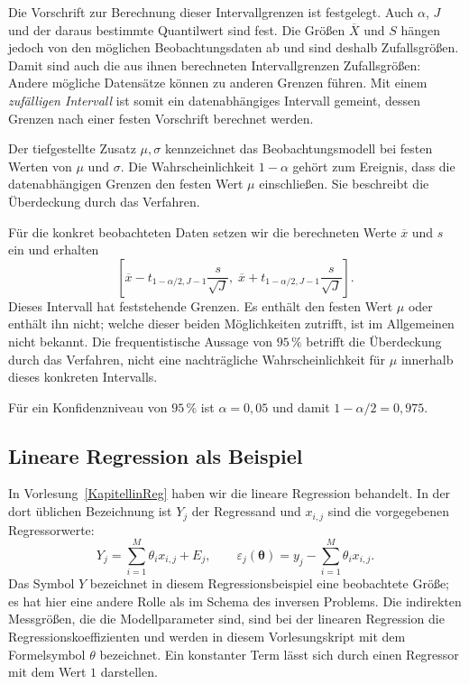 Die Vorschrift zur Berechnung dieser Intervallgrenzen ist festgelegt.
Auch $\alpha$, $J$ und der daraus bestimmte Quantilwert sind fest.
Die Größen $\overline X$ und $S$ hängen jedoch von den möglichen
Beobachtungsdaten ab und sind deshalb Zufallsgrößen. Damit sind
auch die aus ihnen berechneten Intervallgrenzen Zufallsgrößen:
Andere mögliche Datensätze können zu anderen Grenzen führen.
Mit einem \textsl{zufälligen Intervall} ist somit ein datenabhängiges
Intervall gemeint, dessen Grenzen nach einer festen Vorschrift
berechnet werden.

Der tiefgestellte Zusatz $\mu,\sigma$ kennzeichnet das
Beobachtungsmodell bei festen Werten von $\mu$ und $\sigma$.
Die Wahrscheinlichkeit $1-\alpha$ gehört zum Ereignis, dass
die datenabhängigen Grenzen den festen Wert $\mu$ einschließen.
Sie beschreibt die Überdeckung durch das Verfahren.

Für die konkret beobachteten Daten setzen wir die berechneten
Werte $\overline x$ und $s$ ein und erhalten
\begin{equation}
\left[
\overline x-t_{1-\alpha/2,J-1}\frac{s}{\sqrt J},\;
\overline x+t_{1-\alpha/2,J-1}\frac{s}{\sqrt J}
\right].
\label{T2KonfidenzUnbekannt}
\end{equation}
Dieses Intervall hat feststehende Grenzen. Es enthält den festen
Wert $\mu$ oder enthält ihn nicht; welche dieser beiden Möglichkeiten
zutrifft, ist im Allgemeinen nicht bekannt. Die frequentistische
Aussage von $95\,\%$ betrifft die Überdeckung durch das Verfahren,
nicht eine nachträgliche Wahrscheinlichkeit für $\mu$ innerhalb
dieses konkreten Intervalls.

Für ein Konfidenzniveau von $95\,\%$ ist $\alpha=0{,}05$ und
damit $1-\alpha/2=0{,}975$.

\subsection{Lineare Regression als Beispiel}

In Vorlesung~\ref{KapitellinReg} haben wir die lineare Regression behandelt.
In der dort üblichen Bezeichnung ist $Y_j$ der Regressand und
$x_{i,j}$ sind die vorgegebenen Regressorwerte:
\begin{equation}
Y_j=\sum_{i=1}^{M}\theta_i x_{i,j}+E_j,
\qquad
\varepsilon_j(\boldsymbol{\theta})
=y_j-\sum_{i=1}^{M}\theta_i x_{i,j}.
\end{equation}
Das Symbol $Y$ bezeichnet in diesem Regressionsbeispiel eine beobachtete
Größe; es hat hier eine andere Rolle als im Schema des inversen Problems. Die indirekten Messgrößen, die die Modellparameter sind, sind bei der linearen Regression die Regressionskoeffizienten und werden in diesem Vorlesungskript  mit dem Formelsymbol $\theta$ bezeichnet. Ein konstanter Term lässt sich durch einen Regressor mit dem Wert $1$
darstellen. 

